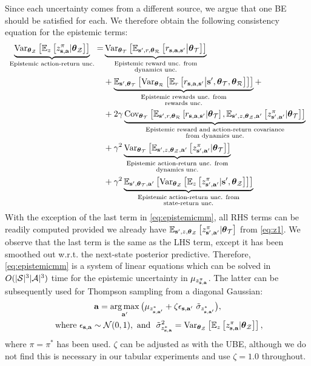 \documentclass{article}
\begin{document}
\begin{appendices}
Since each uncertainty comes from a different source, we argue that one BE should be satisfied for each. We therefore obtain the following consistency equation for the epistemic terms:
\begin{align}\label{eq:epistemicmm}
\underbrace{\Var_{\thetamcz} \sqb{\E_z\sqb{\zb | \thetamcz}}}_{\text{Epistemic action-return unc.}} =& \underbrace{\Var_{\thetamct} \sqb{ \E_{\ns, r, \thetamcr} \sqb{\rsanb \big| \thetamct}}}_{\substack{\text{Epistemic reward unc. from}  \\ \text{dynamics unc.}}} \\
& + \underbrace{\E_{\ns, \thetamct}\sqb{ \Var_{\thetamcr} \sqb{ \E_r \sqb{\rsanb \big| \ns, \thetamct, \thetamcr}}}}_{\substack{\text{Epistemic rewards unc. from} \\ \text{rewards unc.}}} + \nonumber \\
& + 2 \gamma \underbrace{\Cov_{\thetamct}\sqb{\E_{\ns, r, \thetamcr}\sqb{\rsanb | \thetamct}, \E_{\ns, z, \thetamcz, \ac'}\sqb{\znb | \thetamct}}}_{\substack{\text{Epistemic reward and action-return covariance} \\ \text{from dynamics unc.}}} \nonumber \\
& + \gamma^2 \underbrace{\Var_{\thetamct} \sqb{\E_{\ns, z, \thetamcz, \ac'} \sqb{\znb | \thetamct}}}_{\substack{\text{Epistemic action-return unc. from} \\ \text{dynamics unc.}}} \nonumber \\
& +  \gamma^2 \underbrace{\E_{\ns, \thetamct, \ac'}\sqb{\Var_{\thetamcz} \sqb{ \E_z \sqb{\znb | \ns, \thetamcz}}}}_{\substack{\text{Epistemic action-return unc. from} \\ \text{state-return unc.}}} \nonumber
\end{align}
With the exception of the last term in \cref{eq:epistemicmm}, all RHS terms can be readily computed provided we already have $\E_{\ns, z, \thetamcz}\sqb{\znb | \thetamct}$ from \cref{eq:z1}. We observe that the last term is the same as the LHS term, except it has been smoothed out w.r.t. the next-state posterior predictive. Therefore, \cref{eq:epistemicmm} is a system of linear equations which can be solved in $O(|\mcs|^3|\mca|^3)$ time for the epistemic uncertainty in $\mu_{\zb}$. The latter can be subsequently used for Thompson sampling from a diagonal Gaussian:
\begin{gather*}
\ac = \argmax_{\ac'} \big(\mu_{z^{{*}}_{\s, \ac'}} + \zeta \epsilon_{\s, \ac'}~\tilde{\sigma}_{z^*_{\s, \ac'}} \big),\\
\text{ where } \epsilon_{\s, \ac} \sim \mc{N}(0, 1), \text{ and }~\tilde{\sigma}^2_{z^*_{\s, \ac}} = \Var_{\thetamcz} \sqb{\E_z\sqb{\zb | \thetamcz}},
\end{gather*}
where $\pi = \pi^*$ has been used. $\zeta$ can be adjusted as with the UBE, although we do not find this is necessary in our tabular experiments and use $\zeta = 1.0$ throughout.


\end{appendices}
\end{document}
